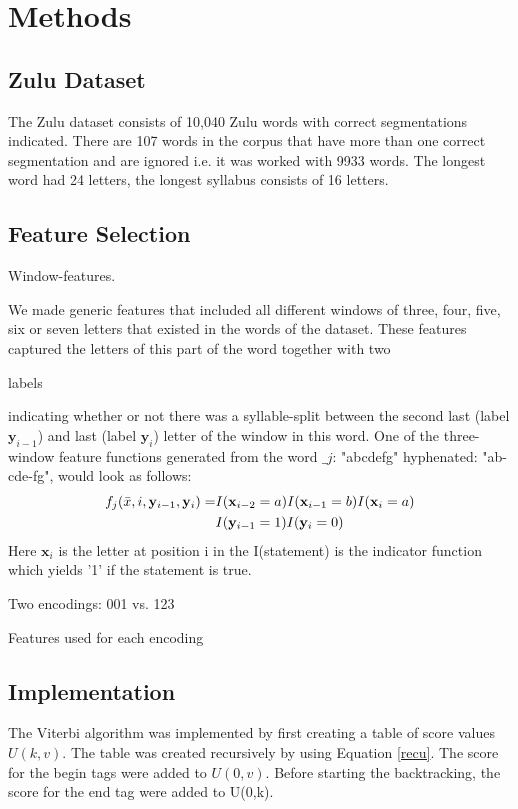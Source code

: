\documentclass[10pt,twocolumn,letterpaper]{article}
\newcommand{\x}{\mathbf{x}}
\newcommand{\y}{\mathbf{y}}
\begin{document}
\section{Methods}
\subsection{Zulu Dataset}
The Zulu dataset consists of 10,040 Zulu words with correct segmentations indicated. There are 107 words in the corpus that have more than one correct segmentation and are ignored i.e. it was worked with 9933 words. The longest word had 24 letters, the longest syllabus consists of 16 letters. 

\subsection{Feature Selection}
\begin{em}Window-features.\end{em} We made generic features that included all different windows of three, four, five, six or seven letters that existed in the words of the dataset. These features captured the letters of this part of the word together with two \begin{em}labels\end{em} indicating whether or not there was a syllable-split between the second last (label $\y_{i-1}$) and last (label $\y_i$) letter of the window in this word. One of the three-window feature functions generated from the word $\_j$: "abcdefg" hyphenated: "ab-cde-fg", would look as follows:
\begin{align}
f_j(\bar{x},i,\y_{i-1},\y_i) =&I(\x_{i-2}=a)I(\x_{i-1}=b)I(\x_i=a)\notag\\
&I(\y_{i-1}=1)I(\y_i=0)
\end{align}
Here $\x_i$ is the letter at position i in the I(statement) is the indicator function which yields '1' if the statement is true.

Two encodings: 001 vs. 123

Features used for each encoding

\subsection{Implementation}

The Viterbi algorithm was implemented by first creating a table of score values $U(k,v)$. The table was created recursively by using Equation \ref{recu}. The score for the begin tags were added to $U(0,v)$. Before starting the backtracking, the score for the end tag were added to U(0,k).
\end{document}
